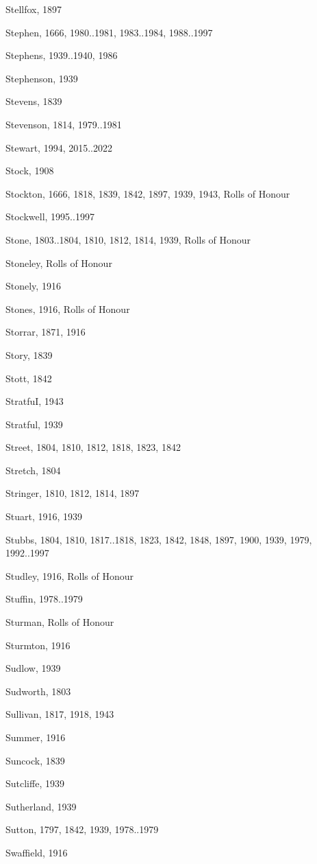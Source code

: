 \begin{theindex}
\item Stellfox, 1897
\item Stephen, 1666, 1980..1981, 1983..1984, 1988..1997
\item Stephens, 1939..1940, 1986
\item Stephenson, 1939
\item Stevens, 1839
\item Stevenson, 1814, 1979..1981
\item Stewart, 1994, 2015..2022
\item Stock, 1908
\item Stockton, 1666, 1818, 1839, 1842, 1897, 1939, 1943, Rolls of Honour
\item Stockwell, 1995..1997
\item Stone, 1803..1804, 1810, 1812, 1814, 1939, Rolls of Honour
\item Stoneley, Rolls of Honour
\item Stonely, 1916
\item Stones, 1916, Rolls of Honour
\item Storrar, 1871, 1916
\item Story, 1839
\item Stott, 1842
\item StratfuI, 1943
\item Stratful, 1939
\item Street, 1804, 1810, 1812, 1818, 1823, 1842
\item Stretch, 1804
\item Stringer, 1810, 1812, 1814, 1897
\item Stuart, 1916, 1939
\item Stubbs, 1804, 1810, 1817..1818, 1823, 1842, 1848, 1897, 1900, 1939, 1979, 1992..1997
\item Studley, 1916, Rolls of Honour
\item Stuffin, 1978..1979
\item Sturman, Rolls of Honour
\item Sturmton, 1916
\item Sudlow, 1939
\item Sudworth, 1803
\item Sullivan, 1817, 1918, 1943
\item Summer, 1916
\item Suncock, 1839
\item Sutcliffe, 1939
\item Sutherland, 1939
\item Sutton, 1797, 1842, 1939, 1978..1979
\item Swaffield, 1916

\end{theindex}
